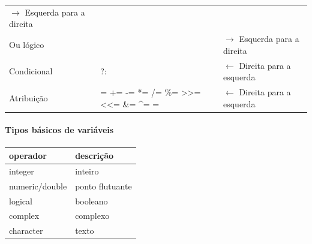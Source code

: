 \documentclass[12pt,a4paper]{article}
\begin{document}
\begin{longtable}[]{@{}lll@{}}
\begin{minipage}[t]{0.21\columnwidth}
\(\rightarrow\) Esquerda para a direita\strut
\end{minipage}\tabularnewline
\begin{minipage}[t]{0.26\columnwidth}\raggedright
Ou lógico\strut
\end{minipage} & \begin{minipage}[t]{0.44\columnwidth}\raggedright
\textbar{}\textbar{}\strut
\end{minipage} & \begin{minipage}[t]{0.21\columnwidth}\raggedright
\(\rightarrow\) Esquerda para a direita\strut
\end{minipage}\tabularnewline
\begin{minipage}[t]{0.26\columnwidth}\raggedright
Condicional\strut
\end{minipage} & \begin{minipage}[t]{0.44\columnwidth}\raggedright
?:\strut
\end{minipage} & \begin{minipage}[t]{0.21\columnwidth}\raggedright
\(\leftarrow\) Direita para a esquerda\strut
\end{minipage}\tabularnewline
\begin{minipage}[t]{0.26\columnwidth}\raggedright
Atribuição\strut
\end{minipage} & \begin{minipage}[t]{0.44\columnwidth}\raggedright
= += -= *= /= \%= \textgreater{}\textgreater{}= \textless{}\textless{}=
\&= \^{}= \textbar{}=\strut
\end{minipage} & \begin{minipage}[t]{0.21\columnwidth}\raggedright
\(\leftarrow\) Direita para a esquerda\strut
\end{minipage}\tabularnewline
\bottomrule
\end{longtable}

    \hypertarget{tipos-buxe1sicos-de-variuxe1veis}{%
\paragraph{Tipos básicos de
variáveis}\label{tipos-buxe1sicos-de-variuxe1veis}}

    \begin{longtable}[]{@{}ll@{}}
\toprule
operador & descrição\tabularnewline
\midrule
\endhead
integer & inteiro\tabularnewline
numeric/double & ponto flutuante\tabularnewline
logical & booleano\tabularnewline
complex & complexo\tabularnewline
character & texto\tabularnewline
\bottomrule
\end{longtable}
\end{document}
